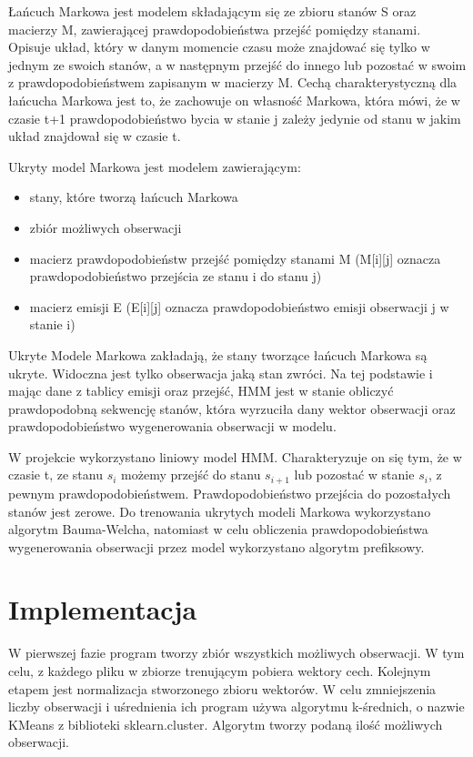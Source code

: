 \documentclass[declaration,shortabstract]{iithesis}
\begin{document}
Łańcuch Markowa jest modelem składającym się ze zbioru stanów S oraz macierzy M, zawierającej prawdopodobieństwa przejść pomiędzy stanami. Opisuje układ, który w danym momencie czasu może znajdować się tylko w jednym ze swoich stanów, a w następnym przejść do innego lub pozostać w swoim z prawdopodobieństwem zapisanym w macierzy M. Cechą charakterystyczną dla łańcucha Markowa jest to, że zachowuje on własność Markowa, która mówi, że w czasie t+1 prawdopodobieństwo bycia w stanie j zależy jedynie od stanu w jakim układ znajdował się w czasie t.

Ukryty model Markowa jest modelem zawierającym:
\begin{itemize}
\item stany, które tworzą łańcuch Markowa
\item zbiór możliwych obserwacji
\item macierz prawdopodobieństw przejść pomiędzy stanami M (M[i][j] oznacza prawdopodobieństwo przejścia ze stanu i do stanu j)
\item macierz emisji E (E[i][j] oznacza prawdopodobieństwo emisji obserwacji j w stanie i)
\end{itemize}

Ukryte Modele Markowa zakładają, że stany tworzące łańcuch Markowa są ukryte. Widoczna jest tylko obserwacja jaką stan zwróci. Na tej podstawie i mając dane z tablicy emisji oraz przejść, HMM jest w stanie obliczyć prawdopodobną sekwencję stanów, która wyrzuciła dany wektor obserwacji oraz prawdopodobieństwo wygenerowania obserwacji w modelu.

W projekcie wykorzystano liniowy model HMM. Charakteryzuje on się tym, że w czasie t, ze stanu $s_{i}$ możemy przejść do stanu $s_{i+1}$ lub pozostać w stanie $s_{i}$, z pewnym prawdopodobieństwem. Prawdopodobieństwo przejścia do pozostałych stanów jest zerowe. Do trenowania ukrytych modeli Markowa wykorzystano algorytm Bauma-Welcha, natomiast w celu obliczenia prawdopodobieństwa wygenerowania obserwacji przez model wykorzystano algorytm prefiksowy.

\section{Implementacja}
W pierwszej fazie program tworzy zbiór wszystkich możliwych obserwacji. W tym celu, z każdego pliku w zbiorze trenującym pobiera wektory cech. Kolejnym etapem jest normalizacja stworzonego zbioru wektorów. W celu zmniejszenia liczby obserwacji i uśrednienia ich program używa algorytmu k-średnich, o nazwie KMeans z biblioteki sklearn.cluster. Algorytm tworzy podaną ilość możliwych obserwacji.
\end{document}
